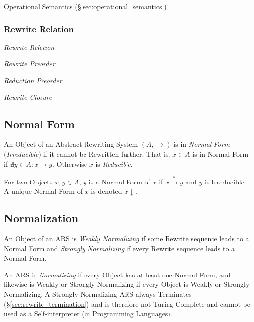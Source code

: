 Operational Semantics (\S\ref{sec:operational_semantics})



\subsubsection{Rewrite Relation}\label{sec:rewrite_relation}

\emph{Rewrite Relation}

\emph{Rewrite Preorder}

\emph{Reduction Preorder}

\emph{Rewrite Closure}



\subsection{Normal Form}\label{sec:normal_form}

An Object of an Abstract Rewriting System $(A,\rightarrow)$ is in
\emph{Normal Form} (\emph{Irreducible}) if it cannot be Rewritten
further. That is, $x \in A$ is in Normal Form if $\nexists y \in A : x
\rightarrow y$. Otherwise $x$ is \emph{Reducible}.

For two Objects $x,y \in A$, $y$ is a Normal Form of $x$ if $x
\stackrel{*}{\rightarrow} y$ and $y$ is Irreducible. A unique Normal
Form of $x$ is denoted $x \downarrow$.



\subsection{Normalization}\label{sec:normalization}

An Object of an ARS is \emph{Weakly Normalizing} if some Rewrite
sequence leads to a Normal Form and \emph{Strongly Normalizing} if
every Rewrite sequence leads to a Normal Form.

An ARS is \emph{Normalizing} if every Object has at least one Normal
Form, and likewise is Weakly or Strongly Normalizing if every Object
is Weakly or Strongly Normalizing. A Strongly Normalizing ARS always
Terminates (\S\ref{sec:rewrite_termination}) and is therefore not Turing
Complete and cannot be used as a Self-interpreter (in Programming
Languages).

